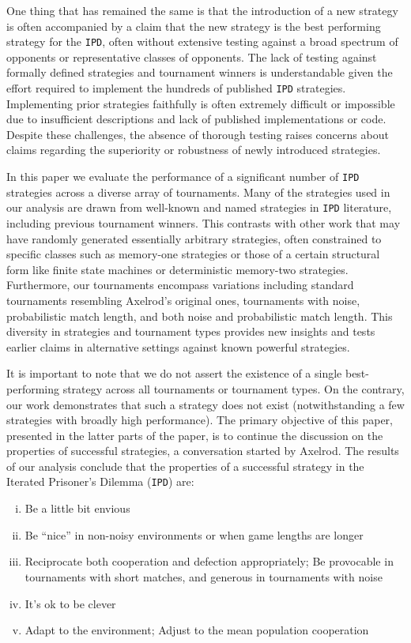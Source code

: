 \documentclass{article}
\def\IPD{\texttt{IPD}}
\begin{document}
One thing that has remained the same is that the introduction of a new strategy
is often accompanied by a claim that the new strategy is the best performing
strategy for the \IPD, often without extensive testing against a broad spectrum
of opponents or representative classes of opponents. The lack of testing against
formally defined strategies and tournament winners is understandable given the
effort required to implement the hundreds of published \IPD{} strategies.
Implementing prior strategies faithfully is often extremely difficult or
impossible due to insufficient descriptions and lack of published
implementations or code. Despite these challenges, the absence of thorough
testing raises concerns about claims regarding the superiority or robustness of
newly introduced strategies.

In this paper we evaluate the performance of a significant number of \IPD{}
strategies across a diverse array of tournaments. Many of the strategies used in
our analysis are drawn from well-known and named strategies in \IPD{} literature,
including previous tournament winners. This contrasts with other work that may
have randomly generated essentially arbitrary strategies, often constrained to
specific classes such as memory-one strategies or those of a certain structural
form like finite state machines or deterministic memory-two strategies.
Furthermore, our tournaments encompass variations including standard
tournaments resembling Axelrod's original ones, tournaments with noise,
probabilistic match length, and both noise and probabilistic match length. This
diversity in strategies and tournament types provides new insights and tests
earlier claims in alternative settings against known powerful strategies.

It is important to note that we do not assert the existence of a single
best-performing strategy across all tournaments or tournament types. On the
contrary, our work demonstrates that such a strategy does not exist
(notwithstanding a few strategies with broadly high performance). The primary
objective of this paper, presented in the latter parts of the paper, is to
continue the discussion on the properties of successful strategies, a
conversation started by Axelrod. 
The results of our analysis conclude that the properties of a successful
strategy in the Iterated Prisoner's Dilemma (\IPD{}) are:

\begin{enumerate}[(i)]
    \item Be a little bit envious
    \item Be ``nice'' in non-noisy environments or when game lengths are longer
    \item Reciprocate both cooperation and defection appropriately;
    Be provocable in tournaments with short matches, and generous in tournaments with noise
    \item It's ok to be clever
    \item Adapt to the environment; Adjust to the mean population cooperation
\end{enumerate}
\end{document}
